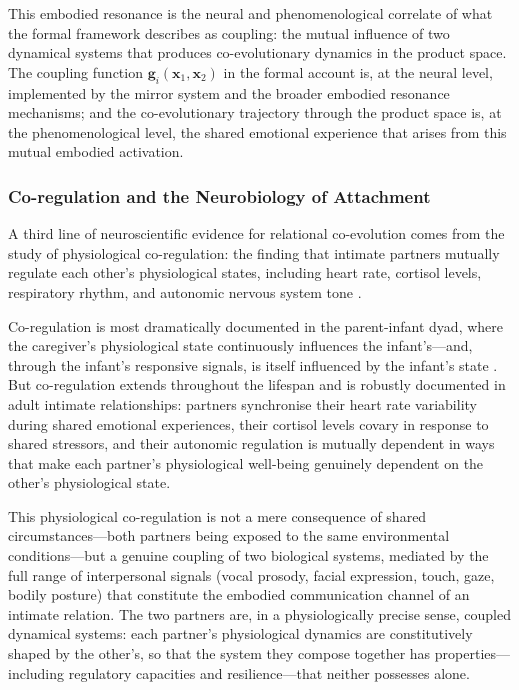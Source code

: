 This embodied resonance is the neural and phenomenological correlate of what the formal framework describes as coupling: the mutual influence of two dynamical systems that produces co-evolutionary dynamics in the product space. The coupling function $\mathbf{g}_i(\mathbf{x}_1, \mathbf{x}_2)$ in the formal account is, at the neural level, implemented by the mirror system and the broader embodied resonance mechanisms; and the co-evolutionary trajectory through the product space is, at the phenomenological level, the shared emotional experience that arises from this mutual embodied activation.

\subsubsection{Co-regulation and the Neurobiology of Attachment}
\label{p14:subsubsec:coregulation}

\noindent
A third line of neuroscientific evidence for relational co-evolution comes from the study of physiological co-regulation: the finding that intimate partners mutually regulate each other's physiological states, including heart rate, cortisol levels, respiratory rhythm, and autonomic nervous system tone \parencite{feldman2007,porges2011}.

Co-regulation is most dramatically documented in the parent-infant dyad, where the caregiver's physiological state continuously influences the infant's---and, through the infant's responsive signals, is itself influenced by the infant's state \parencite{feldman2007}. But co-regulation extends throughout the lifespan and is robustly documented in adult intimate relationships: partners synchronise their heart rate variability during shared emotional experiences, their cortisol levels covary in response to shared stressors, and their autonomic regulation is mutually dependent in ways that make each partner's physiological well-being genuinely dependent on the other's physiological state.

This physiological co-regulation is not a mere consequence of shared circumstances---both partners being exposed to the same environmental conditions---but a genuine coupling of two biological systems, mediated by the full range of interpersonal signals (vocal prosody, facial expression, touch, gaze, bodily posture) that constitute the embodied communication channel of an intimate relation. The two partners are, in a physiologically precise sense, coupled dynamical systems: each partner's physiological dynamics are constitutively shaped by the other's, so that the system they compose together has properties---including regulatory capacities and resilience---that neither possesses alone.

